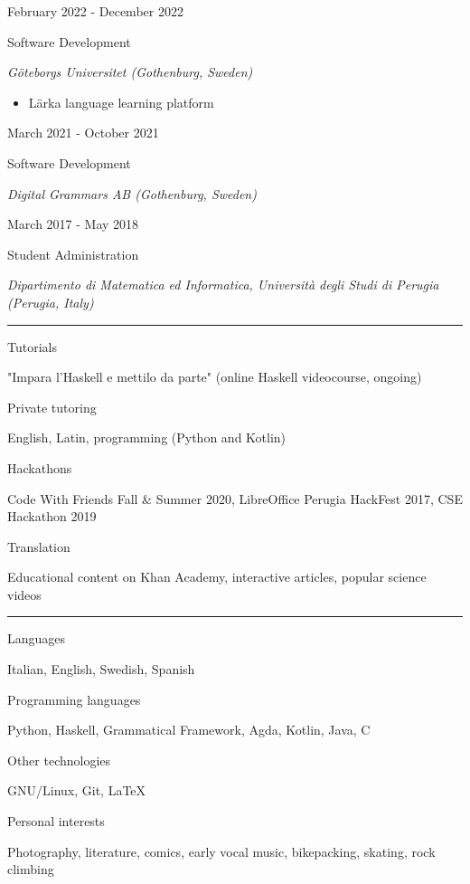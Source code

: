 \documentclass[a4paper,10pt]{article}
\newlength{\cvcolumngapwidth}
\newlength{\cvleftcolumnwidth}
\newlength{\cvrightcolumnwidth}
\newcommand{\cvsectionstyle}[1]{{\normalsize\cvsectionfont\textcolor{cvsectioncolor}{#1}}}
\newcommand{\cvtitlestyle}[1]{{\large\cvtitlefont\textcolor{cvtitlecolor}{#1}}}
\newcommand{\cvdurationstyle}[1]{{\small\cvdurationfont\textcolor{cvdurationcolor}{#1}}}
\newcommand{\cvheadingstyle}[1]{{\normalsize\cvheadingfont\textcolor{cvheadingcolor}{#1}}}
\newlength{\cvafteritemskipamount}
\newlength{\cvaftersectionskipamount}
\newlength{\cvbetweensectionandheadingextraskipamount}
\newlength{\cvaftertitleskipamount}
\newlength{\cvparskip}
\newcommand{\cvsection}[1]{
    \begin{minipage}[t]{\cvleftcolumnwidth}
        \raggedleft\cvsectionstyle{#1}
    \end{minipage}%
    \hspace{\cvcolumngapwidth}%
    \begin{minipage}[t]{\cvrightcolumnwidth}
        \textcolor{cvrulecolor}{\rule{\cvrightcolumnwidth}{0.3mm}}
    \end{minipage}

    \vspace{\cvaftersectionskipamount}
}
\newcommand{\cvitem}[2]{
    \begin{minipage}[t]{\cvleftcolumnwidth}
        \raggedleft #1
    \end{minipage}%
    \hspace{\cvcolumngapwidth}%
    \begin{minipage}[t]{\cvrightcolumnwidth}
        \setlength{\parskip}{\cvparskip} #2
    \end{minipage}

    \vspace{\cvafteritemskipamount}
}
\newcommand{\cvtitle}[1]{
    \cvtitlestyle{#1}

    \vspace{\cvaftertitleskipamount}
    \vspace{-\cvparskip}
}
\begin{document}
\cvitem{
    \cvdurationstyle{February 2022 - December 2022}
}{
    \cvtitle{Software Development}
    \textit{Göteborgs Universitet (Gothenburg, Sweden)}
    \begin{itemize}[leftmargin=*]
    \item Lärka language learning platform
    \end{itemize}
}

\cvitem{
    \cvdurationstyle{March 2021 - October 2021}
}{
    \cvtitle{Software Development}

    \textit{Digital Grammars AB (Gothenburg, Sweden)}
}

\cvitem{
    \cvdurationstyle{March 2017 - May 2018}
}{
    \cvtitle{Student Administration}

    \textit{Dipartimento di Matematica ed Informatica, Università degli Studi di Perugia (Perugia, Italy)}
    
}

%


\cvsection{OTHER EXPERIENCE}

\vspace{\cvbetweensectionandheadingextraskipamount}

\cvitem{
    \cvheadingstyle{Tutorials}
}{
    "Impara l'Haskell e mettilo da parte" (online Haskell videocourse, ongoing)
}

\cvitem{
    \cvheadingstyle{Private tutoring}
}{
    English, Latin, programming (Python and Kotlin)
}

\cvitem{
    \cvheadingstyle{Hackathons}
}{
    Code With Friends Fall \& Summer 2020, LibreOffice Perugia HackFest 2017, CSE Hackathon 2019
}

\cvitem{
    \cvheadingstyle{Translation}
}{
    Educational content on Khan Academy, interactive articles, popular science videos
}


\cvsection{SKILLS AND INTERESTS}

\vspace{\cvbetweensectionandheadingextraskipamount}

\cvitem{
    \cvheadingstyle{Languages}
}{
    Italian, English, Swedish, Spanish
}

\cvitem{
    \cvheadingstyle{Programming languages}
}{
    Python, Haskell, Grammatical Framework, Agda, Kotlin, Java, C
}

\cvitem{
    \cvheadingstyle{Other technologies}
}{
    GNU/Linux, Git, LaTeX
}

\cvitem{
    \cvheadingstyle{Personal interests}
}{
    Photography, literature, comics, early vocal music, bikepacking, skating, rock climbing 
}
\end{document}
